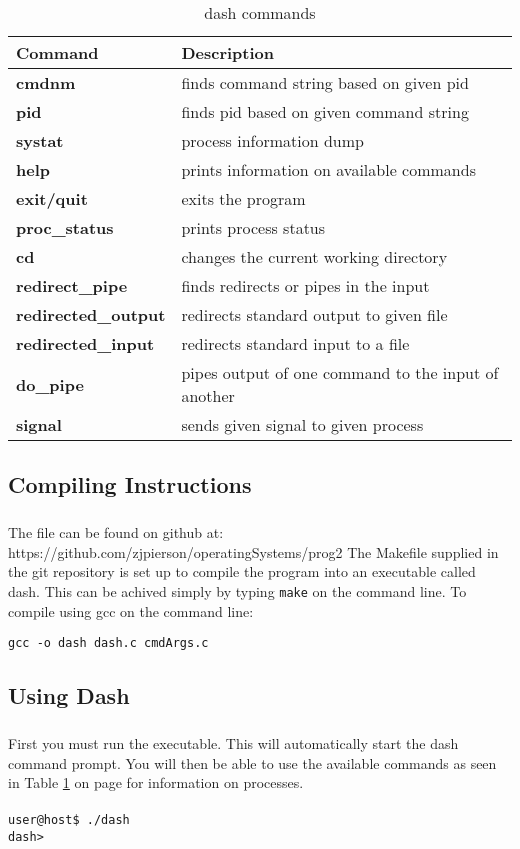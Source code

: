 \documentclass[10pt]{article}
\begin{document}
\begin{table}[b]
\centering
\begin{tabular}{l|l}
	Command & Description\\\hline
	\textbf{cmdnm} & finds command string based on given pid\\
	\textbf{pid} & finds pid based on given command string\\
	\textbf{systat} & process information dump\\
	\textbf{help} & prints information on available commands\\
	\textbf{exit/quit} & exits the program\\
	\textbf{proc\_status} & prints process status\\
	\textbf{cd} & changes the current working directory\\
	\textbf{redirect\_pipe} & finds redirects or pipes in the input\\
	\textbf{redirected\_output} & redirects standard output to given file\\
	\textbf{redirected\_input} & redirects standard input to a file\\
	\textbf{do\_pipe} & pipes output of one command to the input of another\\
	\textbf{signal} & sends given signal to given process\\
\end{tabular}
\caption{dash commands}
\label{table:dashcmds}
\end{table}

\subsection{Compiling Instructions}
\subparagraph{}
The file can be found on github at:  https://github.com/zjpierson/operatingSystems/prog2
The Makefile supplied in the git repository is set up to compile the program into an executable called dash. This can be achived simply by typing \texttt{make} on the command line. To compile using gcc on the command line:
\begin{center}
	\texttt{gcc -o dash dash.c cmdArgs.c}
\end{center}

\subsection{Using Dash}
\subparagraph{}
First you must run the executable. This will automatically start the dash command prompt. You will then be able to use the available commands as seen in Table \ref{table:dashcmds} on page \pageref{table:dashcmds} for information on processes.\\\\
\texttt{user@host\$ ./dash\\
		dash>}
\end{document}
